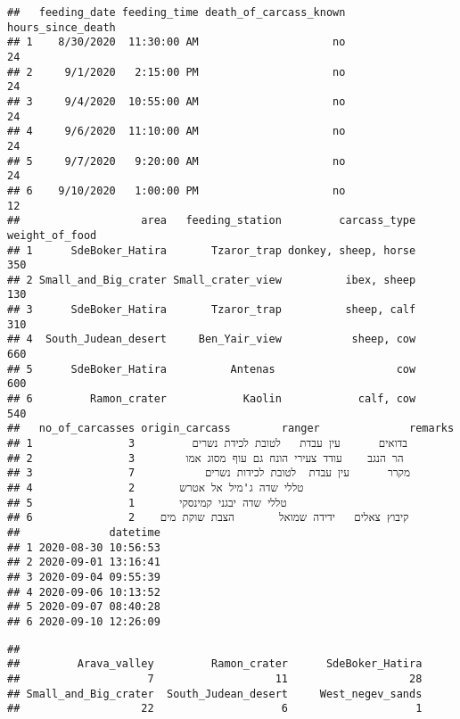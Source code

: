 \documentclass[
]{article}
\newenvironment{Shaded}{\begin{snugshade}}{\end{snugshade}}
\newcommand{\FunctionTok}[1]{\textcolor[rgb]{0.00,0.00,0.00}{#1}}
\newcommand{\NormalTok}[1]{#1}
\newcommand{\SpecialCharTok}[1]{\textcolor[rgb]{0.00,0.00,0.00}{#1}}
\begin{document}
\begin{verbatim}
##   feeding_date feeding_time death_of_carcass_known hours_since_death
## 1    8/30/2020  11:30:00 AM                     no                24
## 2     9/1/2020   2:15:00 PM                     no                24
## 3     9/4/2020  10:55:00 AM                     no                24
## 4     9/6/2020  11:10:00 AM                     no                24
## 5     9/7/2020   9:20:00 AM                     no                24
## 6    9/10/2020   1:00:00 PM                     no                12
##                   area   feeding_station         carcass_type weight_of_food
## 1      SdeBoker_Hatira       Tzaror_trap donkey, sheep, horse            350
## 2 Small_and_Big_crater Small_crater_view          ibex, sheep            130
## 3      SdeBoker_Hatira       Tzaror_trap          sheep, calf            310
## 4  South_Judean_desert     Ben_Yair_view           sheep, cow            660
## 5      SdeBoker_Hatira          Antenas                   cow            600
## 6         Ramon_crater            Kaolin            calf, cow            540
##   no_of_carcasses origin_carcass        ranger              remarks
## 1               3         בדואים      עין עבדת   לטובת לכידת נשרים 
## 2               3        הר הנגב    עודד צעירי הונח גם עוף מסוג אמו
## 3               7           מקרר      עין עבדת  לטובת לכידות נשרים 
## 4               2       טללי שדה ג'מיל אל אטרש                     
## 5               1       טללי שדה יבגני קמינסקי                     
## 6               2    קיבוץ צאלים   ידידה שמואל       הצבת שוקת מים 
##              datetime
## 1 2020-08-30 10:56:53
## 2 2020-09-01 13:16:41
## 3 2020-09-04 09:55:39
## 4 2020-09-06 10:13:52
## 5 2020-09-07 08:40:28
## 6 2020-09-10 12:26:09
\end{verbatim}

\begin{Shaded}
\end{Shaded}

\begin{verbatim}
## 
##         Arava_valley         Ramon_crater      SdeBoker_Hatira 
##                    7                   11                   28 
## Small_and_Big_crater  South_Judean_desert     West_negev_sands 
##                   22                    6                    1
\end{verbatim}
\end{document}
